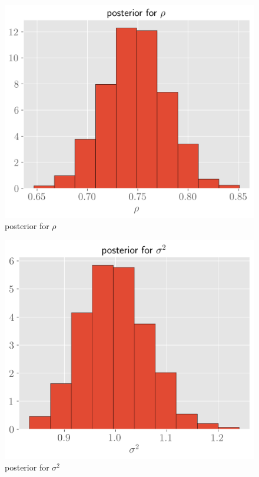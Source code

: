 \documentclass[11pt]{article}
\begin{document}
\begin{figure}[!h]
    \centering
    \includegraphics[scale=.6
    ]{../notebooks/rho.png}
    \caption{posterior for $\rho$}
    \label{fig:my_label}
\end{figure}

\begin{figure}[!h]
    \centering
    \includegraphics[scale=.6
    ]{../notebooks/sig.png}
    \caption{posterior for $\sigma^2$}
    \label{fig:my_label}
\end{figure}
\end{document}
